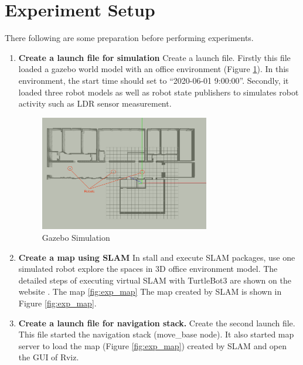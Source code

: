 \section{Experiment Setup}
There following are some preparation before performing experiments. 
\label{sec:experiment_set_up}
\begin{enumerate}
\item \textbf{Create a launch file for simulation} Create a launch file. Firstly this file loaded a gazebo world model with an office environment (Figure \ref{fig:gazebo_model}). In this environment, the start time should set to ``2020-06-01 9:00:00''.  Secondly, it loaded three robot models as well as robot state publishers to simulates robot activity such as LDR sensor measurement.
\begin{figure}[htbp]
    \centering
    \includegraphics[width = 0.7\textwidth]{content/images/ch5/gazebo_model.png}
    \caption{Gazebo Simulation}
    \label{fig:gazebo_model}
\end{figure}

\item \textbf{Create a map using SLAM} In stall and execute SLAM packages, use one simulated robot explore the spaces in 3D office environment model. The detailed steps of executing virtual SLAM with TurtleBot3 are shown on the website \cite{T3SLAM}. The map \ref{fig:exp_map} The map created by SLAM is shown in Figure \ref{fig:exp_map}. 
\item \textbf{Create a launch file for navigation stack.} Create the second launch file. This file started the navigation stack (move\_base node). It also started map server to load the map (Figure \ref{fig:exp_map}) created by SLAM\cite{T3SLAM} and open the GUI of Rviz. 


\end{enumerate}
